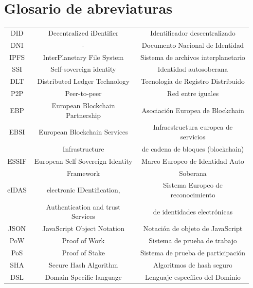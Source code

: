 \documentclass[a4paper,openright,11pt]{book}
\begin{document}
\chapter{Glosario de abreviaturas}
\begin{table}[H]
    \centering
    \begin{tabular}{ c  c  c }
        DID     & Decentralized iDentifier          & Identificador descentralizado \\
        DNI     & -                                 & Documento Nacional de Identidad \\
        IPFS    & InterPlanetary File System        & Sistema de archivos interplanetario\\
        SSI     & Self-sovereign identity           & Identidad autosoberana \\
        DLT     & Distributed Ledger Technology     & Tecnología de Registro Distribuido \\
        P2P     & Peer-to-peer                      & Red entre iguales \\
        EBP     & European Blockchain Partnership   & Asociación Europea de Blockchain \\
        EBSI    & European Blockchain Services      & Infraestructura europea de servicios \\
                & Infrastructure                    & de cadena de bloques (blockchain) \\
        ESSIF   & European Self Sovereign Identity  & Marco Europeo de Identidad Auto \\
                & Framework                         & Soberana \\
        eIDAS   & electronic IDentification,        & Sistema Europeo de reconocimiento \\
                & Authentication and trust Services & de identidades electrónicas \\
        JSON    & JavaScript Object Notation        & Notación de objeto de JavaScript \\
        PoW     & Proof of Work                     & Sistema de prueba de trabajo \\
        PoS     & Proof of Stake                    & Sistema de prueba de participación \\
        SHA     & Secure Hash Algorithm             & Algoritmos de hash seguro \\
        DSL     & Domain-Specific language          & Lenguaje específico del Dominio \\

\end{tabular}
\end{table}
\end{document}
